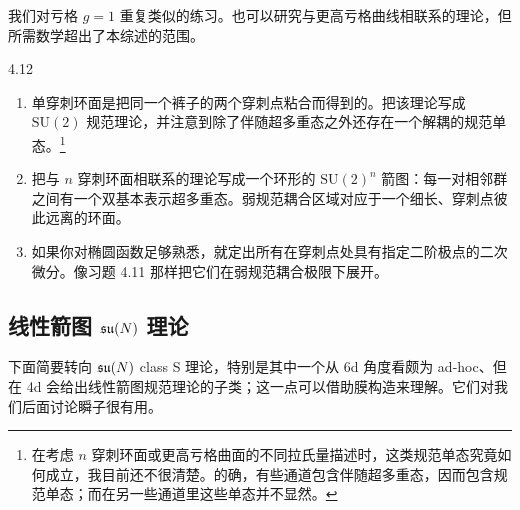 
 我们对亏格 $g=1$ 重复类似的练习。也可以研究与更高亏格曲线相联系的理论，但所需数学超出了本综述的范围。

\begin{exercise}{4.12}
\begin{enumerate}[label=\arabic*.,leftmargin=2em,itemsep=1pt,topsep=1pt]
\item 单穿刺环面是把同一个裤子的两个穿刺点粘合而得到的。把该理论写成 $\mathrm{SU}(2)$ 规范理论，并注意到除了伴随超多重态之外还存在一个解耦的规范单态。\footnote{在考虑 $n$ 穿刺环面或更高亏格曲面的不同拉氏量描述时，这类规范单态究竟如何成立，我目前还不很清楚。的确，有些通道包含伴随超多重态，因而包含规范单态；而在另一些通道里这些单态并不显然。}
\item 把与 $n$ 穿刺环面相联系的理论写成一个环形的 $\mathrm{SU}(2)^n$ 箭图：每一对相邻群之间有一个双基本表示超多重态。弱规范耦合区域对应于一个细长、穿刺点彼此远离的环面。
\item 如果你对椭圆函数足够熟悉，就定出所有在穿刺点处具有指定二阶极点的二次微分。像习题 4.11 那样把它们在弱规范耦合极限下展开。
\end{enumerate}
\end{exercise}

\subsection{线性箭图 $\mathfrak{su}(N)$ 理论}

下面简要转向 $\mathfrak{su}(N)$ class S 理论，特别是其中一个从 6d 角度看颇为 ad-hoc、但在 4d 会给出线性箭图规范理论的子类；这一点可以借助膜构造来理解。它们对我们后面讨论瞬子很有用。


